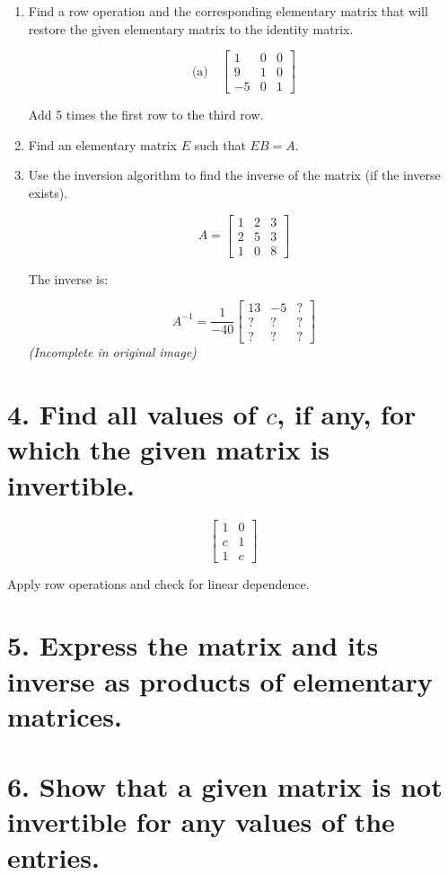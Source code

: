 \documentclass{article}
\begin{document}
\begin{enumerate}
  \item Find a row operation and the corresponding elementary matrix that will restore the given elementary matrix to the identity matrix.

  \[
  \text{(a)} \quad
  \begin{bmatrix}
  1 & 0 & 0 \\
  9 & 1 & 0 \\
  -5 & 0 & 1
  \end{bmatrix}
  \]

  Add 5 times the first row to the third row.

  \item Find an elementary matrix $E$ such that $EB = A$.

  \item Use the inversion algorithm to find the inverse of the matrix (if the inverse exists).

  \[
  A = \begin{bmatrix}
  1 & 2 & 3 \\
  2 & 5 & 3 \\
  1 & 0 & 8
  \end{bmatrix}
  \]

  The inverse is:

  \[
  A^{-1} = \frac{1}{-40}
  \begin{bmatrix}
  13 & -5 & ? \\
  ? & ? & ? \\
  ? & ? & ?
  \end{bmatrix}
  \]
  \textit{(Incomplete in original image)}
\end{enumerate}

\section*{4. Find all values of $c$, if any, for which the given matrix is invertible.}

\[
\begin{bmatrix}
1 & 0 \\
c & 1 \\
1 & c
\end{bmatrix}
\]

Apply row operations and check for linear dependence.

\section*{5. Express the matrix and its inverse as products of elementary matrices.}

\section*{6. Show that a given matrix is not invertible for any values of the entries.}
\end{document}
